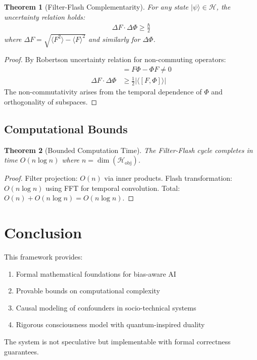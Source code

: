 \documentclass{article}
\newtheorem{theorem}{Theorem}
\begin{document}
\begin{theorem}[Filter-Flash Complementarity]
For any state $|\psi\rangle \in \mathcal{H}$, the uncertainty relation holds:
\begin{align}
\Delta F \cdot \Delta \Phi \geq \frac{\hbar}{2}
\end{align}
where $\Delta F = \sqrt{\langle F^2 \rangle - \langle F \rangle^2}$ and similarly for $\Delta \Phi$.
\end{theorem}

\begin{proof}
By Robertson uncertainty relation for non-commuting operators:
\begin{align}
[F, \Phi] &= F\Phi - \Phi F \neq 0 \\
\Delta F \cdot \Delta \Phi &\geq \frac{1}{2}|\langle [F, \Phi] \rangle|
\end{align}
The non-commutativity arises from the temporal dependence of $\Phi$ and orthogonality of subspaces.
\end{proof}

\subsection{Computational Bounds}

\begin{theorem}[Bounded Computation Time]
The Filter-Flash cycle completes in time $O(n \log n)$ where $n = \dim(\mathcal{H}_{\text{obj}})$.
\end{theorem}

\begin{proof}
Filter projection: $O(n)$ via inner products.
Flash transformation: $O(n \log n)$ using FFT for temporal convolution.
Total: $O(n) + O(n \log n) = O(n \log n)$.
\end{proof}

\section{Conclusion}

This framework provides:
\begin{enumerate}
\item Formal mathematical foundations for bias-aware AI
\item Provable bounds on computational complexity
\item Causal modeling of confounders in socio-technical systems
\item Rigorous consciousness model with quantum-inspired duality
\end{enumerate}

The system is not speculative but implementable with formal correctness guarantees.
\end{document}

